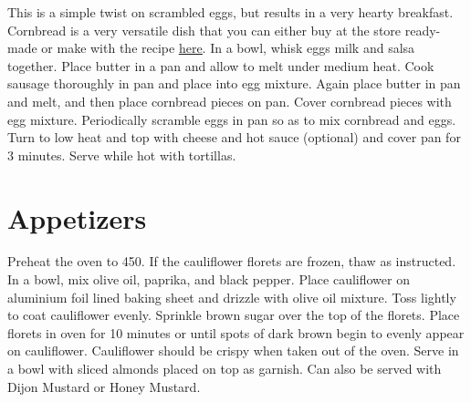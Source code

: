 \documentclass[oneside]{recipe}
\begin{document}
This is a simple twist on scrambled eggs, but results in a very hearty breakfast. Cornbread is a very versatile dish that you can either buy at the store ready-made or make with the recipe \href{}{\underline{here}}. In a bowl, whisk eggs milk and salsa together. Place butter in a pan and allow to melt under medium heat. Cook sausage thoroughly in pan and place into egg mixture. Again place butter in pan and melt, and then place cornbread pieces on pan. Cover cornbread pieces with egg mixture. Periodically scramble eggs in pan so as to mix cornbread and eggs. Turn to low heat and top with cheese and hot sauce (optional) and cover pan for 3 minutes. Serve while hot with tortillas. 



\chapter{Appetizers}
Preheat the oven to 450. If the cauliflower florets are frozen, thaw as instructed. In a bowl, mix olive oil, paprika, and black pepper. Place cauliflower on aluminium foil lined baking sheet and drizzle with olive oil mixture. Toss lightly to coat cauliflower evenly. Sprinkle brown sugar over the top of the florets. Place florets in oven for 10 minutes or until spots of dark brown begin to evenly appear on cauliflower. Cauliflower should be crispy when taken out of the oven. Serve in a bowl with sliced almonds placed on top as garnish. Can also be served with Dijon Mustard or Honey Mustard.

\end{document}

